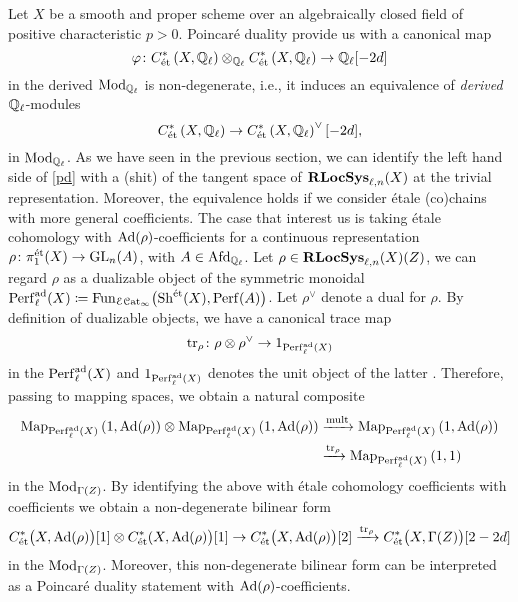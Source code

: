 \documentclass[10pt,a4paper]{amsart}
\numberwithin{equation}{subsection}
\theoremstyle{plain}
\theoremstyle{definition}
\theoremstyle{remark}
\numberwithin{equation}{section}
\begin{document}
 
Let $X$ be a smooth and proper scheme over an algebraically closed field of positive characteristic $p>0$. Poincar\'e duality provide us with a canonical map
	\[
		\varphi \colon C^*_{\text{\'et}} \left( X , \mathbb{Q}_\ell \right) \otimes_{\mathbb{Q}_\ell}  C^*_{\text{\'et}} \left( X , \mathbb{Q}_\ell \right)  \to \mathbb{Q}_\ell[- 2 d]
	\]
in the derived \infcat $\mathrm{Mod}_{\mathbb{Q}_\ell}$ is non-degenerate, i.e., it induces an equivalence of \emph{derived} $\mathbb{Q}_\ell$-modules
	\begin{equation} \label{pd}
		 C^*_{\text{\'et}} \left( X , \mathbb{Q}_\ell \right) \to  C^*_{\text{\'et}} \left( X , \mathbb{Q}_\ell \right) ^\vee [-2d],
	\end{equation}
in $\mathrm{Mod}_{\mathbb{Q}_\ell}$. As we have seen in the previous section, we can identify the left hand side of \eqref{pd} with a (shit) of the tangent space of $\mathbf R \mathbf{LocSys}_{\ell, n}(X)$ at the trivial representation. Moreover, the equivalence \label{pd} holds if we consider \'etale (co)chains
with more general coefficients. The case that interest us is taking \'etale cohomology with $\mathrm{Ad}( \rho)$-coefficients for a continuous representation $\rho \colon \pi_1^{\text{\'et}}(X) \to \mathrm{GL}_n(A)$, with $A \in \mathrm{Afd}_{\mathbb{Q}_\ell}$. Let $\rho \in \mathbf R \mathbf{LocSys}_{\ell, n}(X)(Z)$, we can regard $\rho$
as a dualizable object of the symmetric monoidal \infcat $\mathrm{Perf}^{\mathrm{ad}}_\ell(X) \coloneqq \mathrm{Fun}_{\mathcal E \mathcal{C}\mathrm{at}_\infty} \big( \mathrm{Sh}^{\text{\'et}}(X), \mathrm{Perf}( A ) \big)$. Let $\rho^\vee$ denote a dual for $\rho $. By definition of dualizable objects, we have a canonical trace map
	\[
		\mathrm{tr}_\rho \colon \rho \otimes \rho^\vee \to 1_{\mathrm{Perf}^{\mathrm{ad}}_\ell(X)}
	\]
in the \infcat $\mathrm{Perf}^{\mathrm{ad}}_\ell(X)$ and $1_{\mathrm{Perf}^{\mathrm{ad}}_\ell(X)}$ denotes the unit object of the latter \infcat. Therefore, passing to mapping spaces, we obtain a natural composite
	\begin{align}
		\mathrm{Map}_{\mathrm{Perf}^{\mathrm{ad}}_\ell(X)} \left( 1, \mathrm{Ad}(\rho) \right) \otimes \mathrm{Map}_{\mathrm{Perf}^{\mathrm{ad}}_\ell(X)} \left( 1, \mathrm{Ad}(\rho) \right) & \xrightarrow[]{\mathrm{mult}}
		 \mathrm{Map}_{\mathrm{Perf}^{\mathrm{ad}}_\ell(X)} \left( 1, \mathrm{Ad}(\rho)  \right) \\
		 & \xrightarrow[]{\mathrm{tr}_\rho} \mathrm{Map}_{\mathrm{Perf}^{\mathrm{ad}}_\ell(X)} \left( 1, 1 \right)
	\end{align}
in the \infcat $\mathrm{Mod}_{\Gamma(Z)}$.
By identifying the above with \'etale cohomology coefficients with coefficients we obtain a non-degenerate bilinear form
	\begin{equation} \label{PDet}
		C^*_{\text{\'et}} \big( X, \mathrm{Ad}(\rho) \big)[1] \otimes C_{\text{\'et}}^*(X, \mathrm{Ad}(\rho) \big)[1] \to C_{\text{\'et}}^* \big( X, \mathrm{Ad}(\rho ) \big)[2] \xrightarrow{\mathrm{tr}_\rho} C^*_{\text{\'et}} \big(X,  \Gamma(Z) \big) [2 -2d]
	\end{equation}
in the \infcat $\mathrm{Mod}_{\Gamma(Z)}$. Moreover, this non-degenerate bilinear form can be interpreted as a Poincar\'e duality statement with $\mathrm{Ad}(\rho)$-coefficients.
\end{document}

